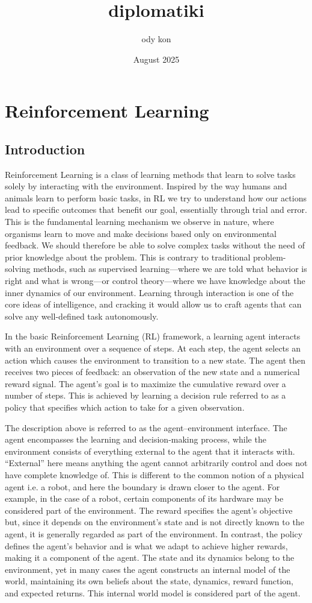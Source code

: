 \documentclass{article}
\title{diplomatiki}
\author{ody kon}
\date{August 2025}
\begin{document}
\maketitle
\section{Reinforcement Learning}
\subsection{Introduction}
Reinforcement Learning is a class of learning methods that learn to solve tasks solely by interacting with the environment. Inspired by the way humans and animals learn to perform basic tasks, in RL we try to understand how our actions lead to specific outcomes that benefit our goal, essentially through trial and error. This is the fundamental learning mechanism we observe in nature, where organisms learn to move and make decisions based only on environmental feedback. We should therefore be able to solve complex tasks without the need of prior knowledge about the problem. This is contrary to traditional problem-solving methods, such as supervised learning—where we are told what behavior is right and what is wrong—or control theory—where we have knowledge about the inner dynamics of our environment. Learning through interaction is one of the core ideas of intelligence, and cracking it would allow us to craft agents that can solve any well-defined task autonomously.

In the basic Reinforcement Learning (RL) framework, a learning agent interacts with an environment over a sequence of steps. At each step, the agent selects an action which causes the environment to transition to a new state. The agent then receives two pieces of feedback: an observation of the new state and a numerical reward signal. The agent's goal is to maximize the cumulative reward over a number of steps. This is achieved by learning a decision rule referred to as a policy that specifies which action to take for a given observation.

The description above is referred to as the agent–environment interface. The agent encompasses the learning and decision-making process, while the environment consists of everything external to the agent that it interacts with. “External” here means anything the agent cannot arbitrarily control and does not have complete knowledge of. This is different to the common notion of a physical agent i.e. a robot, and here the boundary is drawn closer to the agent. For example, in the case of a robot, certain components of its hardware may be considered part of the environment. The reward specifies the agent’s objective but, since it depends on the environment’s state and is not directly known to the agent, it is generally regarded as part of the environment. In contrast, the policy defines the agent’s behavior and is what we adapt to achieve higher rewards, making it a component of the agent. The state and its dynamics belong to the environment, yet in many cases the agent constructs an internal model of the world, maintaining its own beliefs about the state, dynamics, reward function, and expected returns. This internal world model is considered part of the agent.
\end{document}
